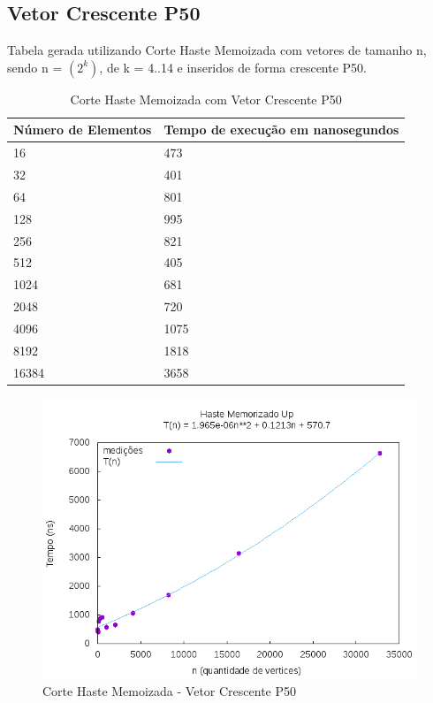\documentclass[12pt,a4paper,twoside]{report}
\begin{document}
\subsection{Vetor Crescente P50}
Tabela gerada utilizando Corte Haste Memoizada com vetores de tamanho n, sendo n = $(2^k)$, de k = 4..14 e inseridos de forma crescente P50.
\begin{table}[H]
\centering
\caption{Corte Haste Memoizada com Vetor Crescente P50}
\label{my-label}
\begin{tabular}{|l|l|}
\hline
\multicolumn{1}{|c|}{\textbf{Número de Elementos}} & \multicolumn{1}{c|}{\textbf{Tempo de execução em nanosegundos}} \\ \hline
16 & 473 \\ \hline
32 & 401 \\ \hline
64 & 801 \\ \hline
128 & 995 \\ \hline
256 & 821 \\ \hline
512 & 405 \\ \hline
1024 & 681 \\ \hline
2048 & 720 \\ \hline
4096 & 1075 \\ \hline
8192 & 1818 \\ \hline
16384 & 3658 \\ \hline
\end{tabular}
\end{table}

\begin{figure}[H]
    \centering
    \includegraphics[width=0.7\linewidth]{graficos/CorteHasteMemorizado/Crescente50/HasteMemo.png}
  \caption{Corte Haste Memoizada - Vetor Crescente P50}
\end{figure}
\end{document}
